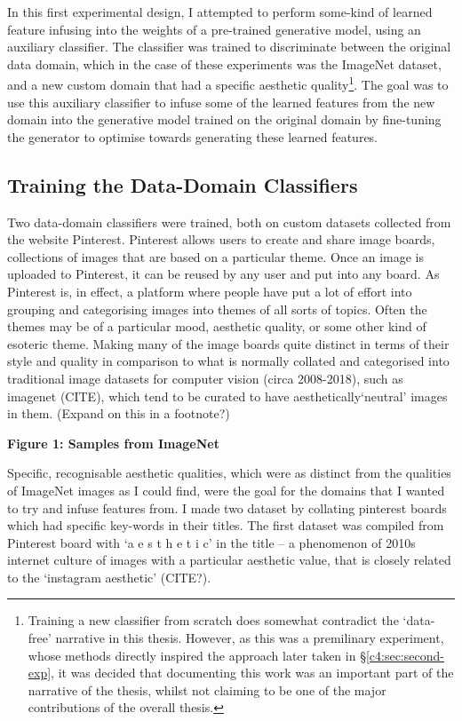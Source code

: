 In this first experimental design, I attempted to perform some-kind of learned feature infusing into the weights of a pre-trained generative model, using an auxiliary classifier. 
The classifier was trained to discriminate between the original data domain, which in the case of these experiments was the ImageNet dataset, and a new custom domain that had a specific aesthetic quality\footnote{Training a new classifier from scratch does somewhat contradict the `data-free' narrative in this thesis. However, as this was a premilinary experiment, whose methods directly inspired the approach later taken in \S \ref{c4:sec:second-exp}, it was decided that documenting this work was an important part of the narrative of the thesis, whilst not claiming to be one of the major contributions of the overall thesis.}. 
The goal was to use this auxiliary classifier to infuse some of the learned features from the new domain into the generative model trained on the original domain by fine-tuning the generator to optimise towards generating these learned features. 

\subsection{Training the Data-Domain Classifiers}

Two data-domain classifiers were trained, both on custom datasets collected from the website Pinterest. Pinterest allows users to create and share image boards, collections of images that are based on a particular theme. 
Once an image is uploaded to Pinterest, it can be reused by any user and put into any board. 
As Pinterest is, in effect, a platform where people have put a lot of effort into grouping and categorising images into themes of all sorts of topics. 
Often the themes may be of a particular mood, aesthetic quality, or some other kind of esoteric theme. 
Making many of the image boards quite distinct in terms of their style and quality in comparison to what is normally collated and categorised into traditional image datasets for computer vision (circa 2008-2018), such as imagenet (CITE), which tend to be curated to have aesthetically`neutral’ images in them. (Expand on this in a footnote?)

\textbf{Figure 1: Samples from ImageNet}

Specific, recognisable aesthetic qualities, which were as distinct from the qualities of ImageNet images as I could find, were the goal for the domains that I wanted to try and infuse features from. 
I made two dataset by collating pinterest boards which had specific key-words in their titles. 
The first dataset was compiled from Pinterest board with ‘a e s t h e t i c’ in the title -- a phenomenon of 2010s internet culture of images with a particular aesthetic value, that is closely related to the `instagram aesthetic' (CITE?). 

